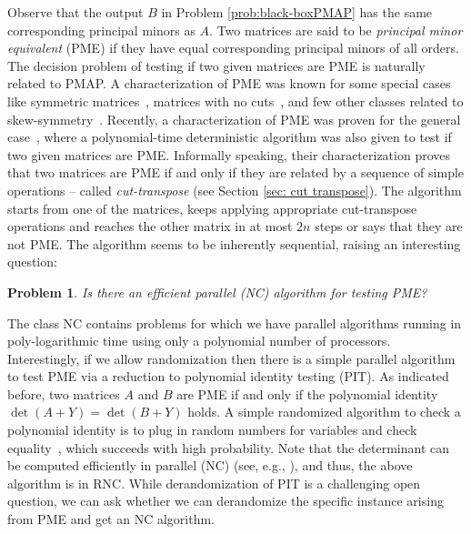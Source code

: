\documentclass[11pt,letterpaper]{article}
\newtheorem{problem}{Problem}[section]
\begin{document}
Observe that the output $B$ in Problem \ref{prob:black-boxPMAP} has the same corresponding principal minors as $A$. Two matrices are said to be \emph{principal minor equivalent} (PME) if they have equal corresponding principal minors of all orders. The decision problem of testing if two given matrices are PME is naturally related to PMAP. A characterization of PME was known for some special cases like symmetric matrices~\cite{ES80}, matrices with no cuts~\cite{Hartfiell84,Loewy86}, and few other classes related to skew-symmetry~\cite{BOUSSAIRI201547,BC16,BoussairiChaichaaCherguiLakhlifi2021}. 
%
Recently, a characterization of PME was proven for the general case~\cite{Chatterjee25},
where a polynomial-time deterministic algorithm was also given to test if two given matrices are PME. 
%
Informally speaking, their characterization proves that two matrices are PME if and only if they are related by a sequence of simple operations -- called \emph{cut-transpose} (see Section \ref{sec: cut transpose}). 
%
The algorithm starts from one of the matrices, keeps applying appropriate cut-transpose operations and reaches the other matrix in at most $2n$ steps or says that they are not PME. 
%
The algorithm seems to be inherently sequential, raising an interesting question: 
\begin{problem} \label{prob:PMEinNC}
Is there an efficient parallel (NC) algorithm for testing PME? 
\end{problem}
%
The class NC contains problems for which we have parallel algorithms running in poly-logarithmic time using only a polynomial number of processors. Interestingly, if we allow randomization then there is a simple parallel algorithm to test PME via a reduction to polynomial identity testing (PIT). As indicated before, two matrices $A$ and $B$ are PME if and only if the polynomial identity $\det(A+Y) = \det(B+Y)$ holds.  
%
A simple randomized algorithm to check a polynomial identity is to plug in random numbers for variables and check equality~\cite{Sch80,DL78,Zip79}, which succeeds with high probability.
%
Note that the determinant can be computed efficiently in parallel (NC) (see, e.g., \cite{Csanky76, Berkowitz84}), and thus, the above algorithm is in RNC.
%
While derandomization of PIT is a challenging open question, we can ask whether we can derandomize the specific instance arising from PME and get an NC algorithm.
\end{document}
